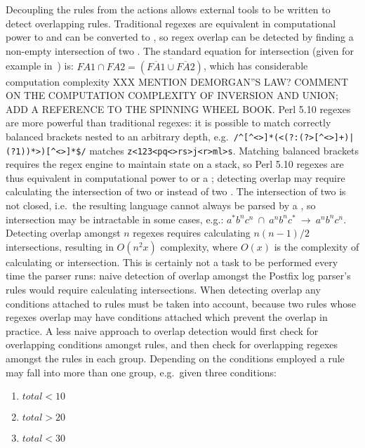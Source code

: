 Decoupling the rules from the actions allows external tools to be written
to detect overlapping rules.  Traditional regexes are equivalent in
computational power to  and can be converted to ,
so regex overlap can be detected by finding a non-empty intersection of two
\@.  The standard equation for  intersection (given
for example in~\cite{intersection-of-NFA-using-Z}) is: $FA1 \cap{} FA2 =
\overline{(\overline{FA1} \cup{} \overline{FA2})}$, which has considerable
computation complexity XXX MENTION DEMORGAN''S LAW\@?  COMMENT ON THE
COMPUTATION COMPLEXITY OF INVERSION AND UNION\@; ADD A REFERENCE TO THE
SPINNING WHEEL BOOK\@.  Perl 5.10 regexes are more powerful than
traditional regexes: it is possible to match correctly balanced brackets
nested to an arbitrary depth, e.g.\
\verb!/^[^<>]*(<(?:(?>[^<>]+)|(?1))*>)[^<>]*$/! matches
\verb!z<123<pq<>rs>j<r>ml>s!.  Matching balanced brackets requires the
regex engine to maintain state on a stack, so Perl 5.10 regexes are thus
equivalent in computational power to  or a \acronym{CFL};
detecting overlap may require calculating the intersection of two
\acronym{PDA} or  instead of two \acronym{FA}.  The
intersection of two \acronyms{CFL} is not closed, i.e.\ the resulting
language cannot always be parsed by a \acronym{CFL}, so intersection may be
intractable in some cases, e.g.:
$a^{*}b^{n}c^{n}~\cap~a^{n}b^{n}c^{*}~\rightarrow~a^{n}b^{n}c^{n}$.
Detecting overlap amongst $n$ regexes requires calculating $n(n-1)/2$
intersections, resulting in $O(n^2x)$ complexity, where $O(x)$ is the
complexity of calculating \acronym{FA} or \acronym{PDA} intersection.
This is certainly not a task to be performed every time the parser runs:
naive detection of overlap amongst the Postfix log parser's
\numberOFrules{} rules would require calculating
\numberOFruleINTERSECTIONS{} intersections.  When detecting overlap any
conditions attached to rules must be taken into account, because two rules
whose regexes overlap may have conditions attached which prevent the
overlap in practice.  A less naive approach to overlap detection would
first check for overlapping conditions amongst rules, and then check for
overlapping regexes amongst the rules in each group.  Depending on the
conditions employed a rule may fall into more than one group, e.g.\ given
three conditions:

\begin{enumerate}

    \item $total < 10$

    \item $total > 20$

    \item $total < 30$

\end{enumerate}

